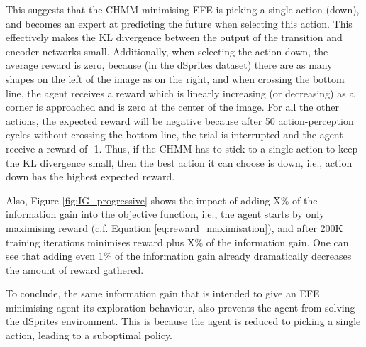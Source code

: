 \documentclass[twoside,11pt]{article}
\begin{document}
This suggests that the CHMM minimising EFE is picking a single action (down), and becomes an expert at predicting the future when selecting this action. This effectively makes the KL divergence between the output of the transition and encoder networks small. Additionally, when selecting the action down, the average reward is zero, because (in the dSprites dataset) there are as many shapes on the left of the image as on the right, and when crossing the bottom line, the agent receives a reward which is linearly increasing (or decreasing) as a corner is approached and is zero at the center of the image. For all the other actions, the expected reward will be negative because after 50 action-perception cycles without crossing the bottom line, the trial is interrupted and the agent receive a reward of -1. Thus, if the CHMM has to stick to a single action to keep the KL divergence  small, then the best action it can choose is down, i.e., action down has the highest expected reward.

Also, Figure \ref{fig:IG_progressive} shows the impact of adding X\% of the information gain into the objective function, i.e., the agent starts by only maximising reward (c.f. Equation \ref{eq:reward_maximisation}), and after 200K training iterations minimises reward plus X\% of the information gain. One can see that adding even 1\% of the information gain already dramatically decreases the amount of reward gathered.

To conclude, the same information gain that is intended to give an EFE minimising agent its exploration behaviour, also prevents the agent from solving the dSprites environment. This is because the agent is reduced to picking a single action, leading to a suboptimal policy.
\end{document}
